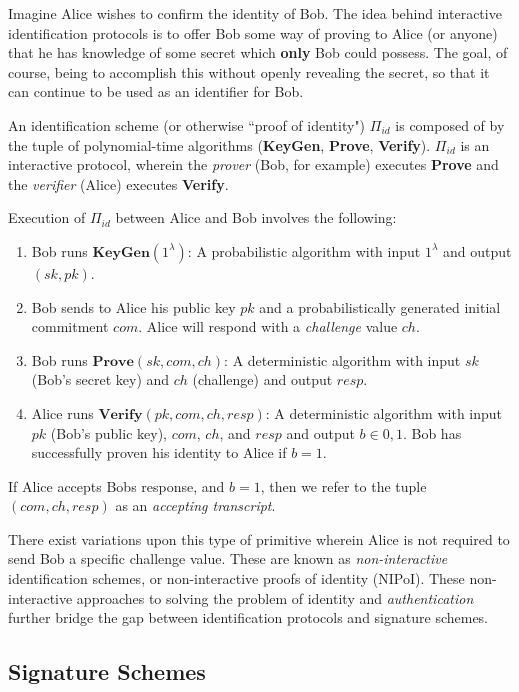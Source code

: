 Imagine Alice wishes to confirm the identity of Bob. The idea behind interactive identification protocols is to offer Bob some way of proving to Alice (or anyone) that he has knowledge of some secret which \textbf{only} Bob could possess. The goal, of course, being to accomplish this without openly revealing the secret, so that it can continue to be used as an identifier for Bob. 

An identification scheme (or otherwise ``proof of identity") $\Pi_{id}$ is composed of by the tuple of polynomial-time algorithms (\textbf{KeyGen}, \textbf{Prove}, \textbf{Verify}). $\Pi_{id}$ is an interactive protocol, wherein the \emph{prover} (Bob, for example) 
executes \textbf{Prove} and the \emph{verifier} (Alice) executes \textbf{Verify}.

Execution of $\Pi_{id}$ between Alice and Bob involves the following:
\begin{enumerate}[label=(\roman*)]
\item Bob runs $\textbf{KeyGen}(1^\lambda)$: A probabilistic algorithm with input $1^\lambda$ and output $(sk,pk)$. 
\item Bob sends to Alice his public key $pk$ and a probabilistically generated initial commitment $com$. Alice will respond with a \emph{challenge} value $ch$.
\item Bob runs $\textbf{Prove}(sk, com, ch)$: A deterministic algorithm with input $sk$ (Bob's secret key) and $ch$ (challenge) and output $resp$.
\item Alice runs $\textbf{Verify}(pk, com, ch, resp)$: A deterministic algorithm with input $pk$ (Bob's public key), $com$, $ch$, and $resp$ and output $b \in {0,1}$. Bob has successfully proven his identity to Alice if $b = 1$.
\end{enumerate}

If Alice accepts Bobs response, and $b = 1$, then we refer to the tuple $(com,ch,resp)$ as an \emph{accepting transcript}.

There exist variations upon this type of primitive wherein Alice is not required to send Bob a specific challenge value. These are known as \emph{non-interactive} identification schemes, or non-interactive proofs of identity (NIPoI). These non-interactive approaches to solving the problem of identity and \emph{authentication} further bridge the gap between identification protocols and signature schemes. 

\subsection{Signature Schemes}

